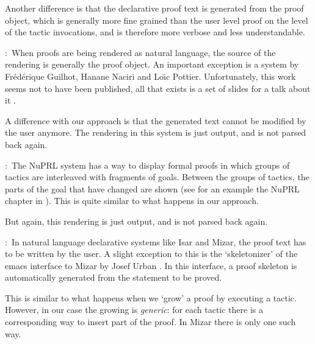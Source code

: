 \documentclass{LMCS}
\begin{document}
\begin{desCription}
Another difference is that the declarative proof text is generated
from the proof object, which is generally more fine grained than
the user level proof on the level of the tactic invocations,
and is therefore more verbose and less understandable.
\medskip

\item{}:\
When proofs are being rendered as natural language,
the source of the rendering is generally the proof object.
An important exception is a system
by Fr\'ed\'erique Guilhot, Hanane Naciri and Lo\"\i c Pottier.
Unfortunately, this work seems not to have been published,
all that exists is a set of slides for a talk about it \cite{gui:03}.

A difference with our approach is that the generated text cannot
be modified by the user anymore.
The rendering in this system is just output, and is not parsed back again.
\medskip

\item{}:\
The NuPRL system \cite{con:all:bro:cle:cre:har:how:kno:men:pan:sas:smi:86} has a way to display formal proofs in which
groups of tactics are interleaved with fragments of goals.
Between the groups of tactics, the parts of the goal that have changed
are shown
(see for an example the NuPRL chapter in \cite{wie:06}).
This is quite similar to what happens in our approach.

But again, this rendering is just output, and is not parsed back again.
\medskip

\item{}:\
In natural language declarative systems like Isar and Mizar, the proof
text has to be written by the user.
A slight exception to this is the `skeletonizer' of the emacs interface
to Mizar by Josef Urban \cite{urb:06:1}.
In this interface, a proof skeleton
is automatically generated from
the statement to be proved.

This is similar to what happens when we `grow' a proof by executing
a tactic.
However, in our case the growing is \emph{generic}: for each tactic
there is a corresponding way to insert part of the proof.
In Mizar there is only one such way.

\end{desCription}
\end{document}

